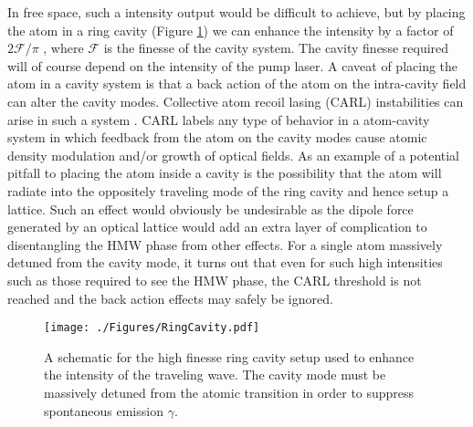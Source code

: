  In free space, such a intensity output would be difficult to achieve, but by placing the atom in a ring cavity (Figure \ref{fig:ringcavity}) we can enhance the intensity by a factor of $2\mathcal{F}/\pi$ \cite{spectroscopy}, where $\mathcal{F}$ is the finesse of the cavity system.  The cavity finesse required will of course depend on the intensity of the pump laser.
A caveat of placing the atom in a cavity system is that a back action of the atom on the intra-cavity field can alter the cavity modes. Collective atom recoil lasing (CARL) instabilities can arise in such a system \cite{courteille}.  CARL labels any type of behavior in a atom-cavity system in which feedback from the atom on the cavity modes cause atomic density modulation and/or growth of optical fields.  As an example of a potential pitfall to placing the atom inside a cavity is the possibility that the atom will radiate into the oppositely traveling mode of the ring cavity and hence setup a lattice.  Such an effect would obviously be undesirable as the dipole force generated by an optical lattice would add an extra layer of complication to disentangling the HMW phase from other effects.  For a single atom massively detuned from the cavity mode, it turns out that even for such high intensities such as those required to see the HMW phase, the CARL threshold is not reached \cite{hemmerich} and the back action effects may safely be ignored.  
\begin{figure}[htp]
\texttt{[image: ./Figures/RingCavity.pdf]}
\caption{A schematic for the high finesse ring cavity setup used to enhance the intensity of the traveling wave. The cavity mode must be massively detuned from the atomic transition in order to suppress spontaneous emission $\gamma$. } 
\label{fig:ringcavity}
\end{figure}

